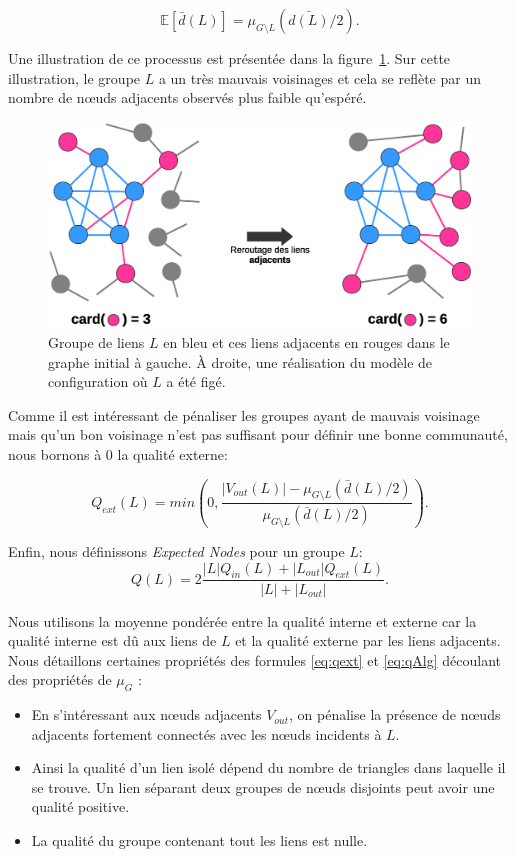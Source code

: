 \begin{equation}
	\mathbb{E}[\bar{d}(L)] = \mu_{G\setminus L}(\bar{d(L)}/2).
\end{equation}

Une illustration de ce processus est présentée dans la figure~\ref{fig:retourt_ext}.
Sur cette illustration, le groupe $L$ a un très mauvais voisinages et cela se reflète par un nombre de n\oe uds adjacents observés plus faible qu'espéré.

\begin{figure}
\centering
\includegraphics[width=0.7\linewidth]{img/ExpectedNodes/reroutageExt3}
\caption{Groupe de liens $L$ en \textcolor{semilightblue}{bleu} et ces liens adjacents en \textcolor{pinkyred}{rouges} dans le graphe initial à gauche.
\`A droite, une réalisation du modèle de configuration où $L$ a été figé.}
\label{fig:retourt_ext}
\end{figure}

Comme il est intéressant de pénaliser les groupes ayant de mauvais voisinage mais qu'un bon voisinage n'est pas suffisant pour définir une bonne communauté, nous bornons à $0$ la qualité externe:

\begin{equation}
\label{eq:qext} Q_{ext}(L) = min \left(0, \dfrac{|V_{out}(L)| - \mu_{G\setminus L}(\bar{d}(L)/2)}{\mu_{G\setminus L}(\bar{d}(L)/2)} \right).
\end{equation}


Enfin, nous définissons \emph{Expected Nodes} pour un groupe $L$:
\begin{equation}
	\label{eq:qAlg}
	Q(L)  =  2\dfrac{ |L|Q_{in}(L) + |L_{out}|Q_{ext}(L)}{|L|+|L_{out}|}.
\end{equation}

Nous utilisons la moyenne pondérée entre la qualité interne et externe car la qualité interne est dû aux liens de $L$ et la qualité externe par les liens adjacents.
Nous détaillons certaines propriétés des formules \ref{eq:qext} et \ref{eq:qAlg} découlant des propriétés de $\mu_{G}$ :
\begin{itemize}
\item En s'intéressant aux n\oe uds adjacents $V_{out}$, on pénalise la présence de n\oe uds adjacents fortement connectés avec les n\oe uds incidents à $L$.
\item Ainsi la qualité d'un lien isolé dépend du nombre de triangles dans laquelle il se trouve. Un lien séparant deux groupes de n\oe uds disjoints peut avoir une qualité positive.
\item La qualité du groupe contenant tout les liens est nulle.
\end{itemize}

